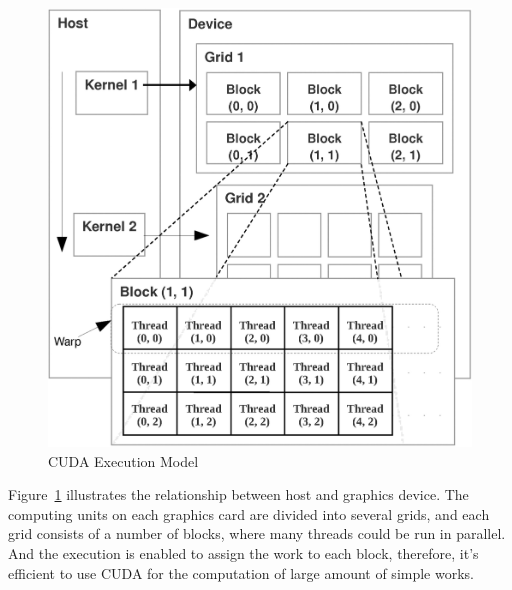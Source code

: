 \documentclass[11pt, b5paper]{report}
\begin{document}
\begin{figure}[h!]
  \centering
  \includegraphics[width=\textwidth-1in]{images/executionmodel.jpg}
  \caption{CUDA Execution Model}
  \label{fig:_cuda_exec}
\end{figure}

Figure~\ref{fig:_cuda_exec} illustrates the relationship between host and
graphics device. The computing units on each graphics card are divided into
several grids, and each grid consists of a number of blocks, where many 
threads could be run in parallel. And the execution is enabled to 
assign the work to each block, therefore, it's efficient to use CUDA for 
the computation of large amount of simple works.
 

\end{document}
